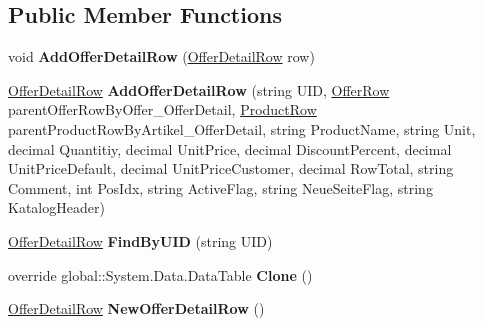 \subsection*{Public Member Functions}
\begin{DoxyCompactItemize}
\item 
void {\bfseries Add\+Offer\+Detail\+Row} (\hyperlink{class_products_1_1_data_1_1ds_sage_1_1_offer_detail_row}{Offer\+Detail\+Row} row)\hypertarget{class_products_1_1_data_1_1ds_sage_1_1_offer_detail_data_table_a87eb7ecfc19e6a0391cc9cd2bf94ef60}{}\label{class_products_1_1_data_1_1ds_sage_1_1_offer_detail_data_table_a87eb7ecfc19e6a0391cc9cd2bf94ef60}

\item 
\hyperlink{class_products_1_1_data_1_1ds_sage_1_1_offer_detail_row}{Offer\+Detail\+Row} {\bfseries Add\+Offer\+Detail\+Row} (string U\+ID, \hyperlink{class_products_1_1_data_1_1ds_sage_1_1_offer_row}{Offer\+Row} parent\+Offer\+Row\+By\+Offer\+\_\+\+Offer\+Detail, \hyperlink{class_products_1_1_data_1_1ds_sage_1_1_product_row}{Product\+Row} parent\+Product\+Row\+By\+Artikel\+\_\+\+Offer\+Detail, string Product\+Name, string Unit, decimal Quantitiy, decimal Unit\+Price, decimal Discount\+Percent, decimal Unit\+Price\+Default, decimal Unit\+Price\+Customer, decimal Row\+Total, string Comment, int Pos\+Idx, string Active\+Flag, string Neue\+Seite\+Flag, string Katalog\+Header)\hypertarget{class_products_1_1_data_1_1ds_sage_1_1_offer_detail_data_table_a927448d637fa585675290d581d437513}{}\label{class_products_1_1_data_1_1ds_sage_1_1_offer_detail_data_table_a927448d637fa585675290d581d437513}

\item 
\hyperlink{class_products_1_1_data_1_1ds_sage_1_1_offer_detail_row}{Offer\+Detail\+Row} {\bfseries Find\+By\+U\+ID} (string U\+ID)\hypertarget{class_products_1_1_data_1_1ds_sage_1_1_offer_detail_data_table_a2d4a99c0e78d4dcc0725f26bf9d41f05}{}\label{class_products_1_1_data_1_1ds_sage_1_1_offer_detail_data_table_a2d4a99c0e78d4dcc0725f26bf9d41f05}

\item 
override global\+::\+System.\+Data.\+Data\+Table {\bfseries Clone} ()\hypertarget{class_products_1_1_data_1_1ds_sage_1_1_offer_detail_data_table_ae775d4864d0ddb69d8aaa54d3d22191a}{}\label{class_products_1_1_data_1_1ds_sage_1_1_offer_detail_data_table_ae775d4864d0ddb69d8aaa54d3d22191a}

\item 
\hyperlink{class_products_1_1_data_1_1ds_sage_1_1_offer_detail_row}{Offer\+Detail\+Row} {\bfseries New\+Offer\+Detail\+Row} ()\hypertarget{class_products_1_1_data_1_1ds_sage_1_1_offer_detail_data_table_ab4525ec6f026640341c5d57feea3f107}{}\label{class_products_1_1_data_1_1ds_sage_1_1_offer_detail_data_table_ab4525ec6f026640341c5d57feea3f107}


\end{DoxyCompactItemize}
